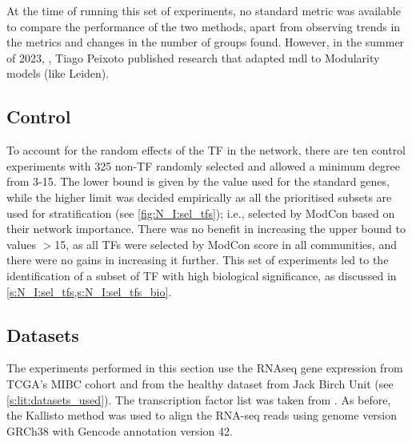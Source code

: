 At the time of running this set of experiments, no standard metric was available to compare the performance of the two methods, apart from observing trends in the metrics and changes in the number of groups found. However, in the summer of 2023, \cite{Peixoto2023-se}, Tiago Peixoto published research that adapted \acrshort{mdl} to Modularity models (like Leiden).

\subsection*{Control}

To account for the random effects of the TF in the network, there are ten control experiments with 325 non-TF randomly selected and allowed a minimum degree from 3-15. The lower bound is given by the value used for the standard genes, while the higher limit was decided empirically as all the prioritised subsets are used for stratification (see \cref{fig:N_I:sel_tfs}); i.e., selected by ModCon based on their network importance. There was no benefit in increasing the upper bound to values $>$15, as all TFs were selected by ModCon score in all communities, and there were no gains in increasing it further. This set of experiments led to the identification of a subset of TF with high biological significance, as discussed in \cref{s:N_I:sel_tfs,s:N_I:sel_tfs_bio}.

\subsection*{Datasets}

The experiments performed in this section use the RNAseq gene expression from TCGA's MIBC cohort and from the healthy dataset from Jack Birch Unit (see \cref{s:lit:datasets_used}). The transcription factor list was taken from \citet{Lambert2018-el}. As before, the Kallisto method was used to align the RNA-seq reads using genome version GRCh38 with Gencode annotation version 42. 


